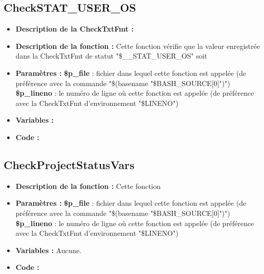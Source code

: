\documentclass[a4paper,10pt]{article}
\begin{document}
\color{green}
\subsection{CheckSTAT\_USER\_OS}\color{white}
\begin{itemize}
    \item \textbf{Description de la CheckTxtFmt :}

    \item \textbf{Description de la fonction :} Cette fonction vérifie que la valeur enregistrée dans la CheckTxtFmt de statut "\$\_\_STAT\_USER\_OS" soit

    \item \textbf{Paramètres :}
        \color{orange}\textbf{\$p\_file}\color{white} : fichier dans lequel cette fonction est appelée (de préférence avec la commande "\$(\color{gray}basename \color{white}"\color{orange}\$BASH\_SOURCE[0]\color{white}")")
    \color{orange}\textbf{\$p\_lineno}\color{white} : le numéro de ligne où cette fonction est appelée (de préférence avec la CheckTxtFmt d'environnement "\color{orange}\$LINENO\color{white}")

    \item \textbf{Variables :}

    \item \textbf{Code :}
\end{itemize}

\color{green}
\subsection{CheckProjectStatusVars}\color{white}
\begin{itemize}
    \item \textbf{Description de la fonction :} Cette fonction

    \item \textbf{Paramètres :}
        \color{orange}\textbf{\$p\_file}\color{white} : fichier dans lequel cette fonction est appelée (de préférence avec la commande "\$(\color{gray}basename \color{white}"\color{orange}\$BASH\_SOURCE[0]\color{white}")")
    \color{orange}\textbf{\$p\_lineno}\color{white} : le numéro de ligne où cette fonction est appelée (de préférence avec la CheckTxtFmt d'environnement "\color{orange}\$LINENO\color{white}")

    \item \textbf{Variables :} Aucune.

    \item \textbf{Code :}
\end{itemize}
\end{document}
